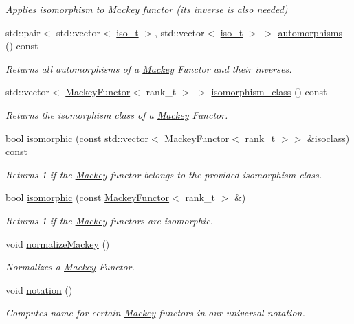 \begin{DoxyCompactItemize}
\begin{DoxyCompactList}\small\item\em Applies isomorphism to \hyperlink{namespaceMackey}{Mackey} functor (its inverse is also needed) \end{DoxyCompactList}\item 
std\+::pair$<$ std\+::vector$<$ \hyperlink{classMackey_1_1MackeyFunctor_a53637e79f2502411ba085d2b2a61bb67}{iso\+\_\+t} $>$, std\+::vector$<$ \hyperlink{classMackey_1_1MackeyFunctor_a53637e79f2502411ba085d2b2a61bb67}{iso\+\_\+t} $>$ $>$ \hyperlink{classMackey_1_1MackeyFunctor_a454e5488d62aa1e8d5ff4df71aeecfa1}{automorphisms} () const
\begin{DoxyCompactList}\small\item\em Returns all automorphisms of a \hyperlink{namespaceMackey}{Mackey} Functor and their inverses. \end{DoxyCompactList}\item 
std\+::vector$<$ \hyperlink{classMackey_1_1MackeyFunctor}{Mackey\+Functor}$<$ rank\+\_\+t $>$ $>$ \hyperlink{classMackey_1_1MackeyFunctor_a71e081ee78f53fe74e8f65106865f4c5}{isomorphism\+\_\+class} () const
\begin{DoxyCompactList}\small\item\em Returns the isomorphism class of a \hyperlink{namespaceMackey}{Mackey} Functor. \end{DoxyCompactList}\item 
bool \hyperlink{classMackey_1_1MackeyFunctor_a8cd5c9415c0c63c6d79dfa9b0067f416}{isomorphic} (const std\+::vector$<$ \hyperlink{classMackey_1_1MackeyFunctor}{Mackey\+Functor}$<$ rank\+\_\+t $>$$>$ \&isoclass) const
\begin{DoxyCompactList}\small\item\em Returns 1 if the \hyperlink{namespaceMackey}{Mackey} functor belongs to the provided isomorphism class. \end{DoxyCompactList}\item 
bool \hyperlink{classMackey_1_1MackeyFunctor_af183c1f4d1558bc3c7dc75dcf8161ee8}{isomorphic} (const \hyperlink{classMackey_1_1MackeyFunctor}{Mackey\+Functor}$<$ rank\+\_\+t $>$ \&)
\begin{DoxyCompactList}\small\item\em Returns 1 if the \hyperlink{namespaceMackey}{Mackey} functors are isomorphic. \end{DoxyCompactList}\item 
void \hyperlink{classMackey_1_1MackeyFunctor_a08150b3655fc27a7298d68b1857d830f}{normalize\+Mackey} ()
\begin{DoxyCompactList}\small\item\em Normalizes a \hyperlink{namespaceMackey}{Mackey} Functor. \end{DoxyCompactList}\item 
void \hyperlink{classMackey_1_1MackeyFunctor_a2b333a786e44000c96ffd087a81a1d17}{notation} ()
\begin{DoxyCompactList}\small\item\em Computes name for certain \hyperlink{namespaceMackey}{Mackey} functors in our universal notation. \end{DoxyCompactList}\end{DoxyCompactItemize}
